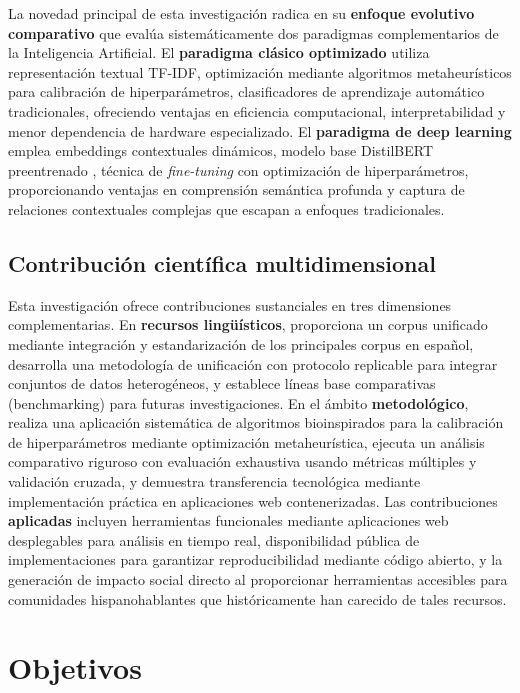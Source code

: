 La novedad principal de esta investigación radica en su \textbf{enfoque evolutivo comparativo} que evalúa sistemáticamente dos paradigmas complementarios de la Inteligencia Artificial. El \textbf{paradigma clásico optimizado} utiliza representación textual TF-IDF, optimización mediante algoritmos metaheurísticos para calibración de hiperparámetros, clasificadores de aprendizaje automático tradicionales, ofreciendo ventajas en eficiencia computacional, interpretabilidad y menor dependencia de hardware especializado. El \textbf{paradigma de deep learning} emplea embeddings contextuales dinámicos, modelo base DistilBERT preentrenado \cite{sanh2019distilbert}, técnica de \textit{fine-tuning} con optimización de hiperparámetros, proporcionando ventajas en comprensión semántica profunda y captura de relaciones contextuales complejas que escapan a enfoques tradicionales.

\subsection{Contribución científica multidimensional}

Esta investigación ofrece contribuciones sustanciales en tres dimensiones complementarias. En \textbf{recursos lingüísticos}, proporciona un corpus unificado mediante integración y estandarización de los principales corpus en español, desarrolla una metodología de unificación con protocolo replicable para integrar conjuntos de datos heterogéneos, y establece líneas base comparativas (benchmarking) para futuras investigaciones. En el ámbito \textbf{metodológico}, realiza una aplicación sistemática de algoritmos bioinspirados para la calibración de hiperparámetros mediante optimización metaheurística, ejecuta un análisis comparativo riguroso con evaluación exhaustiva usando métricas múltiples y validación cruzada, y demuestra transferencia tecnológica mediante implementación práctica en aplicaciones web contenerizadas. Las contribuciones \textbf{aplicadas} incluyen herramientas funcionales mediante aplicaciones web desplegables para análisis en tiempo real, disponibilidad pública de implementaciones para garantizar reproducibilidad mediante código abierto, y la generación de impacto social directo al proporcionar herramientas accesibles para comunidades hispanohablantes que históricamente han carecido de tales recursos.

\section{Objetivos}

